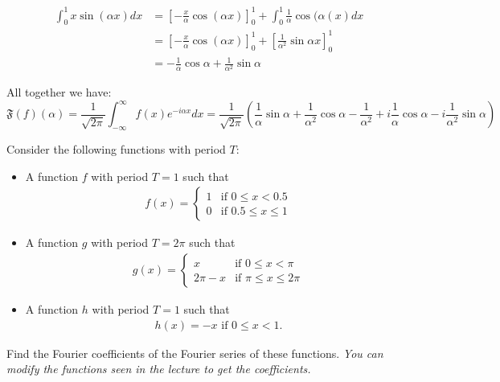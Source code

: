 \documentclass[11pt]{article}
\begin{document}
\begin{solution}
$$\begin{aligned} \int_0^1 x \sin (\alpha x) d x & =\left[-\frac{x}{\alpha} \cos (\alpha x)\right]_0^1+\int_0^1 \frac{1}{\alpha} \cos (\alpha(x) d x \\ & =\left[-\frac{x}{\alpha} \cos (\alpha x)\right]_0^1+\left[\frac{1}{\alpha^2} \sin \alpha x\right]_0^1 \\ & =-\frac{1}{\alpha} \cos \alpha+\frac{1}{\alpha^2} \sin \alpha\end{aligned}$$

All together we have:
$$
\mathfrak{F}(f)(\alpha)=\frac{1}{\sqrt{2 \pi}} \int_{-\infty}^{\infty} f(x) e^{-i \alpha x} d x = \frac{1}{\sqrt{2\pi}}\left(\frac{1}{\alpha} \sin \alpha+\frac{1}{\alpha^2} \cos \alpha-\frac{1}{\alpha^2} +i\frac{1}{\alpha} \cos \alpha-i\frac{1}{\alpha^2} \sin \alpha\right)
$$
\end{solution}





\begin{exercise}
    Consider the following functions with period $T$:
    \begin{itemize}
        \item A function $f$ with period $T = 1$ such that 
        \begin{align*}
            f(x) = 
            \left\{\begin{array}{ll}
                1 & \text{if } 0 \leq x < 0.5 \\
                0 & \text{if } 0.5 \leq x \leq 1
            \end{array}\right.
        \end{align*}
        \item A function $g$ with period $T = 2\pi$ such that 
        \begin{align*}
            g(x) = 
            \left\{\begin{array}{ll}
                x & \text{if } 0 \leq x < \pi \\
                2\pi - x & \text{if } \pi \leq x \leq 2\pi
            \end{array}\right.
        \end{align*}
        \item A function $h$ with period $T = 1$ such that 
        \begin{align*}
            h(x) = -x \text{ if } 0 \leq x < 1.
        \end{align*}
    \end{itemize}
    Find the Fourier coefficients of the Fourier series of these functions. 
    \textit{You can modify the functions seen in the lecture to get the coefficients.}
\end{exercise}
\end{document}

